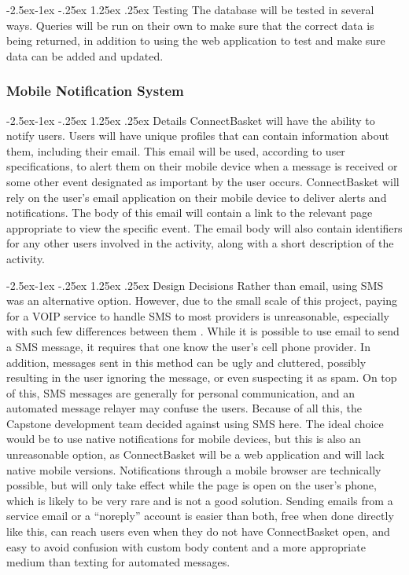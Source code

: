 \documentclass[onecolumn, draftclsnofoot,10pt, compsoc]{IEEEtran}
\makeatletter
\renewcommand\paragraph{\@startsection{paragraph}{4}{\z@}%
            {-2.5ex\@plus -1ex \@minus -.25ex}%
            {1.25ex \@plus .25ex}%
            {\normalfont\normalsize\bfseries}}
\makeatother
\begin{document}
\paragraph{Testing}
The database will be tested in several ways. Queries will be run on their own to make sure that the correct data is being returned, in addition to using the web application to test and make sure data can be added and updated.

\subsubsection{Mobile Notification System}

\paragraph{Details}
ConnectBasket will have the ability to notify users. Users will have unique profiles that can contain information about them, including their email. This email will be used, according to user specifications, to alert them on their mobile device when a message is received or some other event designated as important by the user occurs. ConnectBasket will rely on the user's email application on their mobile device to deliver alerts and notifications. The body of this email will contain a link to the relevant page appropriate to view the specific event. The email body will also contain identifiers for any other users involved in the activity, along with a short description of the activity.


\paragraph{Design Decisions}
Rather than email, using SMS was an alternative option. However, due to the small scale of this project, paying for a VOIP service to handle SMS to most providers is unreasonable, especially with such few differences between them \cite{notifications}. While it is possible to use email to send a SMS message, it requires that one know the user's cell phone provider. In addition, messages sent in this method can be ugly and cluttered, possibly resulting in the user ignoring the message, or even suspecting it as spam. On top of this, SMS messages are generally for personal communication, and an automated message relayer may confuse the users. Because of all this, the Capstone development team decided against using SMS here. The ideal choice would be to use native notifications for mobile devices, but this is also an unreasonable option, as ConnectBasket will be a web application and will lack native mobile versions. Notifications through a mobile browser are technically possible, but will only take effect while the page is open on the user’s phone, which is likely to be very rare and is not a good solution. Sending emails from a service email or a “noreply” account is easier than both, free when done directly like this, can reach users even when they do not have ConnectBasket open, and easy to avoid confusion with custom body content and a more appropriate medium than texting for automated messages.
\end{document}
